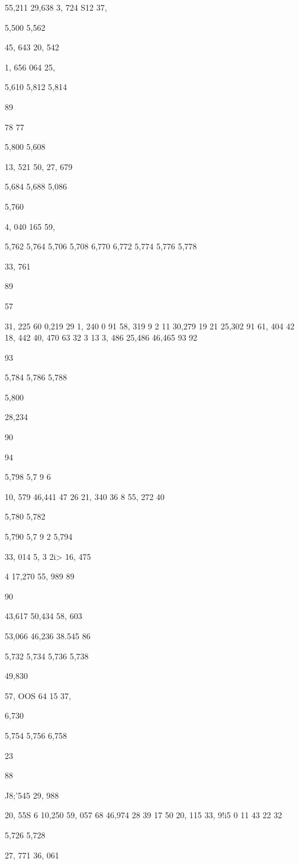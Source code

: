 \documentclass[10pt,a4paper]{article}
\begin{document}
55,211
29,638
3, 724
S12
37,

5,500
5,562

45, 643
20, 542

1, 656
064
25,

5,610
5,812
5,814

89

78
77

5,800
5,608

13, 521
50,
27, 679

5,684
5,688
5,086

5,760

4, 040
165
59,

5,762
5,764
5,706
5,708
6,770
6,772
5,774
5,776
5,778

33, 761

89

57

31, 225
60
0,219
29
1, 240
0
91
58, 319
9 2 11 30,279
19
21
25,302
91
61, 404
42 18, 442
40, 470
63
32
3
13
3, 486
25,486
46,465
93
92

93

5,784
5,786
5,788

5,800

28,234

90

94

5,798
5,7 9 6

10, 579
46,441
47
26 21, 340
36
8 55, 272
40

5,780
5,782

5,790
5,7 9 2
5,794

33, 014
5, 3 2i>
16, 475

4 17,270
55, 989
89

90

43,617
50,434
58, 603

53,066
46,236
38.545
86

5,732
5,734
5,736
5,738

49,830

57, OOS
64
15 37,

6,730

5,754
5,756
6,758

23

88

J8;'545
29, 988

20, 55S
6
10,250
59, 057
68 46,974
28
39
17
50
20,
115
33, 9!i5
0
11
43
22
32

5,726
5,728

27, 771
36, 061
\end{document}
